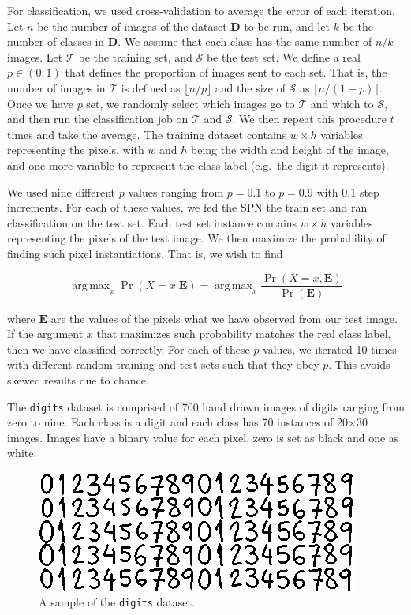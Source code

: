 \documentclass{amsart}
\DeclareMathOperator*{\argmax}{arg\,max}
\theoremstyle{plain}
\numberwithin{equation}{section}
\newcommand{\set}[1]{\mathbf{#1}}
\newcommand{\code}[1]{\lstinline[mathescape=true]{#1}}
\begin{document}
For classification, we used cross-validation to average the error of each iteration. Let $n$ be the
number of images of the dataset $\set{D}$ to be run, and let $k$ be the number of classes in
$\set{D}$. We assume that each class has the same number of $n/k$ images. Let $\mathcal{T}$ be the
training set, and $\mathcal{S}$ be the test set. We define a real $p\in (0, 1)$ that defines the
proportion of images sent to each set. That is, the number of images in $\mathcal{T}$ is defined as
$\lfloor n/p \rfloor$ and the size of $\mathcal{S}$ as $\lceil n/(1-p) \rceil$. Once we have $p$
set, we randomly select which images go to $\mathcal{T}$ and which to $\mathcal{S}$, and then run
the classification job on $\mathcal{T}$ and $\mathcal{S}$. We then repeat this procedure $t$ times
and take the average. The training dataset contains $w\times h$ variables representing the pixels,
with $w$ and $h$ being the width and height of the image, and one more variable to represent the
class label (e.g.\ the digit it represents).

We used nine different $p$ values ranging from $p=0.1$ to $p=0.9$ with $0.1$ step increments. For
each of these values, we fed the SPN the train set and ran classification on the test set. Each
test set instance contains $w\times h$ variables representing the pixels of the test image. We then
maximize the probability of finding such pixel instantiations. That is, we wish to find

\begin{equation*}
  \argmax_x \Pr(X=x | \set{E}) = \argmax_x \frac{\Pr(X=x, \set{E})}{\Pr(\set{E})}
\end{equation*}

where $\set{E}$ are the values of the pixels what we have observed from our test image. If the
argument $x$ that maximizes such probability matches the real class label, then we have classified
correctly. For each of these $p$ values, we iterated 10 times with different random training and
test sets such that they obey $p$. This avoids skewed results due to chance.

The \code{digits} dataset is comprised of 700 hand drawn images of digits ranging from zero to
nine. Each class is a digit and each class has 70 instances of 20$\times$30 images. Images have a
binary value for each pixel, zero is set as black and one as white.

\begin{figure}[h]
  \centering\includegraphics[scale=0.8]{imgs/digits_sample.png}
  \caption{A sample of the \code{digits} dataset.}
\end{figure}
\end{document}

